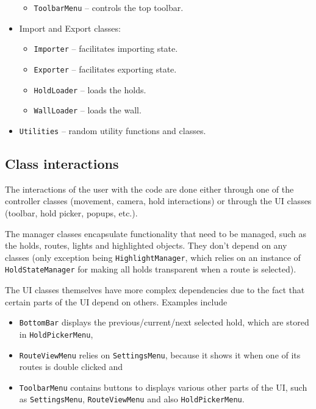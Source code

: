 \begin{itemize}
\begin{itemize}
		\item \verb|ToolbarMenu| -- controls the top toolbar.
	\end{itemize}
	\item Import and Export classes:
	\begin{itemize}
		\item \verb|Importer| -- facilitates importing state.
		\item \verb|Exporter| -- facilitates exporting state.
		\item \verb|HoldLoader| -- loads the holds.
		\item \verb|WallLoader| -- loads the wall.
	\end{itemize}
	\item \verb|Utilities| -- random utility functions and classes.
\end{itemize}

\subsection{Class interactions}

The interactions of the user with the code are done either through one of the controller classes (movement, camera, hold interactions) or through the UI classes (toolbar, hold picker, popups, etc.).

The manager classes encapsulate functionality that need to be managed, such as the holds, routes, lights and highlighted objects.
They don't depend on any classes (only exception being \verb|HighlightManager|, which relies on an instance of \verb|HoldStateManager| for making all holds transparent when a route is selected).

The UI classes themselves have more complex dependencies due to the fact that certain parts of the UI depend on others. 
Examples include
\begin{itemize}
		\item \verb|BottomBar| displays the previous/current/next selected hold, which are stored in \verb|HoldPickerMenu|,
		\item \verb|RouteViewMenu| relies on \verb|SettingsMenu|, because it shows it when one of its routes is double clicked and
		\item \verb|ToolbarMenu| contains buttons to displays various other parts of the UI, such as \verb|SettingsMenu|, \verb|RouteViewMenu| and also \verb|HoldPickerMenu|.
\end{itemize}
